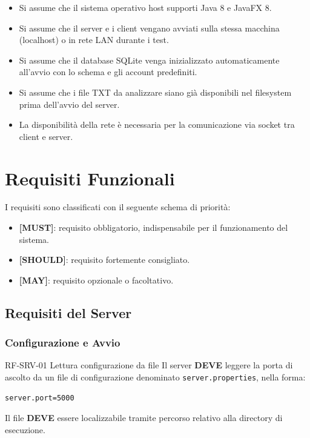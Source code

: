\documentclass[12pt, a4paper]{article}
\newcommand{\mustshall}{\textbf{DEVE}}
\newcommand{\code}[1]{\texttt{#1}}
\begin{document}
\begin{itemize}[leftmargin=*]
    \item Si assume che il sistema operativo host supporti Java 8 e JavaFX 8.
    \item Si assume che il server e i client vengano avviati sulla stessa macchina (localhost) o in rete LAN durante i test.
    \item Si assume che il database SQLite venga inizializzato automaticamente all'avvio con lo schema e gli account predefiniti.
    \item Si assume che i file TXT da analizzare siano già disponibili nel filesystem prima dell'avvio del server.
    \item La disponibilità della rete è necessaria per la comunicazione via socket tra client e server.
\end{itemize}

\newpage
\section{Requisiti Funzionali}

I requisiti sono classificati con il seguente schema di priorità:
\begin{itemize}[leftmargin=*]
    \item \textbf{[MUST]}: requisito obbligatorio, indispensabile per il funzionamento del sistema.
    \item \textbf{[SHOULD]}: requisito fortemente consigliato.
    \item \textbf{[MAY]}: requisito opzionale o facoltativo.
\end{itemize}

\subsection{Requisiti del Server}

\subsubsection{Configurazione e Avvio}

\begin{reqbox}{RF-SRV-01 \quad Lettura configurazione da file \quad [MUST]}
Il server \mustshall{} leggere la porta di ascolto da un file di configurazione denominato \code{server.properties}, nella forma:
\begin{lstlisting}[language={}]
server.port=5000
\end{lstlisting}
Il file \mustshall{} essere localizzabile tramite percorso relativo alla directory di esecuzione.
\end{reqbox}
\end{document}
